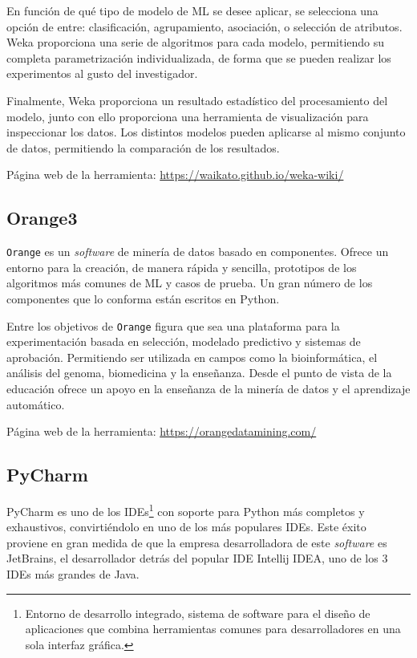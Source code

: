 En función de qué tipo de modelo de ML se desee aplicar, se selecciona una opción de entre: clasificación, agrupamiento, asociación, o selección de atributos. Weka proporciona una serie de algoritmos para cada modelo, permitiendo su completa parametrización individualizada, de forma que se pueden realizar los experimentos al gusto del investigador. 

Finalmente, Weka proporciona un resultado estadístico del procesamiento del modelo, junto con ello proporciona una herramienta de visualización para inspeccionar los datos. Los distintos modelos pueden aplicarse al mismo conjunto de datos, permitiendo la comparación de los resultados.

Página web de la herramienta: \url{https://waikato.github.io/weka-wiki/}

\subsection{Orange3}
\texttt{Orange} es un \textit{software} de minería de datos basado en componentes. Ofrece un entorno para la creación, de manera rápida y sencilla, prototipos de los algoritmos más comunes de ML y casos de prueba. Un gran número de los componentes que lo conforma están escritos en Python.

Entre los objetivos de \texttt{Orange} figura que sea una plataforma para la experimentación basada en selección, modelado predictivo y sistemas de aprobación. Permitiendo ser utilizada en campos como la bioinformática, el análisis del genoma, biomedicina y la enseñanza. Desde el punto de vista de la educación ofrece un apoyo en la enseñanza de la minería de datos y el aprendizaje automático.

Página web de la herramienta: \url{https://orangedatamining.com/}


\subsection{PyCharm}

PyCharm es uno de los IDEs\footnote{Entorno de desarrollo integrado, sistema de software para el diseño de aplicaciones que combina herramientas comunes para desarrolladores en una sola interfaz gráfica.} con soporte para Python más completos y exhaustivos, convirtiéndolo en uno de los más populares IDEs. Este éxito proviene en gran medida de que la empresa desarrolladora de este \textit{software} es JetBrains, el desarrollador detrás del popular IDE Intellij IDEA, uno de los 3 IDEs más grandes de Java.

